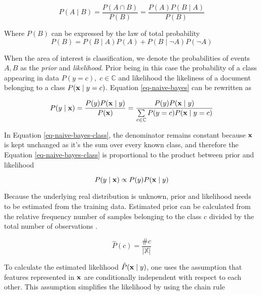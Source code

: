 \begin{equation} \label{eq-naive-bayes}
    P(A \mid B) = \dfrac{P(A \cap B)}{P(B)} = \dfrac{P(A)P(B \mid A)}{P(B)}
\end{equation}

\noindent
Where $P(B)$ can be expressed by the law of total probability
\begin{equation}
    P(B) = P(B \mid A)P(A) + P(B \mid \lnot A)P(\lnot A)
\end{equation}

When the area of interest is classification, we denote the probabilities of events $A,B$ as the \emph{prior} and \emph{likelihood}. Prior being in this case the probability of a class appearing in data $P(y=c), \; c \in \mathbb{C}$ and likelihood the likeliness of a document belonging to a class $P(\mathbf{x} \mid y=c)$. Equation \ref{eq-naive-bayes} can be rewritten as \cite{Zhang04theoptimality, acemNBtc2001}

\begin{equation} \label{eq-naive-bayes-class}
    P(y \mid \mathbf{x}) = \dfrac{P(y)P(\mathbf{x} \mid y)}{P(\mathbf{x})} = \dfrac{P(y)P(\mathbf{x} \mid y)}{\sum \limits_{c \in \mathbb{C}} P(y=c)P(\mathbf{x} \mid y=c)}
\end{equation}

In Equation \ref{eq-naive-bayes-class}, the denominator remains constant because $\mathbf{x}$ is kept unchanged as it's the sum over every known class, and therefore the Equation \ref{eq-naive-bayes-class} is proportional to the product between prior and likelihood \cite{Manning:2008:IIR:1394399}

\begin{equation}
    P(y \mid \mathbf{x}) \propto P(y)P(\mathbf{x} \mid y)
\end{equation}

Because the underlying real distribution is unknown, prior and likelihood needs to be estimated from the training data. Estimated prior can be calculated from the relative frequency \ie number of samples belonging to the class $c$ divided by the total number of observations \cite{Manning:2008:IIR:1394399}.

\begin{equation}
    \hat{P}(c) = \frac{\#c}{|\mathbb{X}|}
\end{equation}

\noindent
 To calculate the estimated likelihood $\hat{P}(\mathbf{x} \mid y)$, one uses the assumption that features represented in $\mathbf{x}$ are conditionally independent with respect to each other. This assumption simplifies the likelihood by using the chain rule \cite{Manning:2008:IIR:1394399}

